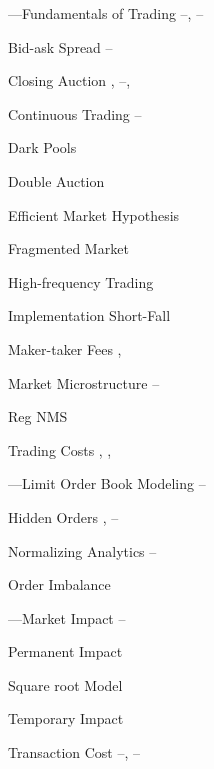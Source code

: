 \begin{minipage}{0.40\textwidth}
\noindent ---Fundamentals of Trading \pageref{in:fund_trade1}--\pageref{in:fund_trade2}, \pageref{in:fund_trade3}--\pageref{in:fund_trade4}
	\begin{flushright}
	Bid-ask Spread \pageref{in:bidask1}--\pageref{in:bidask2} \par
	Closing Auction \pageref{in:close1}, \pageref{in:close2}--\pageref{in:close3}, \pageref{in:close4} \par
	Continuous Trading \pageref{in:cont_trade1}--\pageref{in:cont_trade2} \par
	Dark Pools \pageref{in:dark} \par
	Double Auction \pageref{in:double} \par
	Efficient Market Hypothesis \pageref{in:efficient} \par
	Fragmented Market \pageref{in:fragmented} \par
	High-frequency Trading \pageref{in:higheff} \par
	Implementation Short-Fall \pageref{in:shortfall} \par
	Maker-taker Fees \pageref{in:takerfee1}, \pageref{in:takerfee2} \par
	Market Microstructure \pageref{in:micro1}--\pageref{in:micro2} \par
	Reg NMS \pageref{in:regnms} \par
	Trading Costs \pageref{in:tradecost1}, \pageref{in:tradecost2}, \pageref{in:tradecost3}
	\end{flushright}


\noindent ---Limit Order Book Modeling  \pageref{in:labmod1}--\pageref{in:labmod2}
	\begin{flushright}
	Hidden Orders \pageref{in:hidden1}, \pageref{in:hidden2}--\pageref{in:hidden3} \par
	Normalizing Analytics \pageref{in:norm1}--\pageref{in:norm2} \par
	Order Imbalance \pageref{in:imbalance} \par
	\end{flushright}


\noindent ---Market Impact \pageref{in:impact1}--\pageref{in:impact2}
	\begin{flushright}
	Permanent Impact \pageref{in:permimp} \par
	Square root Model \pageref{in:sqmodel} \par
	Temporary Impact \pageref{in:tempimpact} \par
	Transaction Cost \pageref{in:transcost1}--\pageref{in:transcost2}, \pageref{in:transcost3}--\pageref{in:transcost4}
	\end{flushright}



\end{minipage}
